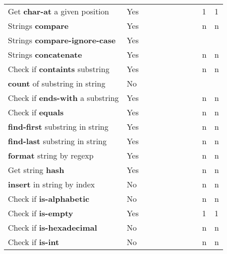 \documentclass[anonymous,sigplan,review,11pt,nonacm,natbib=false]{acmart}
\begin{document}
\begin{longtable}{lllllllllll}
        Get \textbf{char-at} a given position & Yes &  &  &  &  & &  &  & 1 & 1 \\

        Strings \textbf{compare} & Yes &  &  &  &  & &  &  & n & n \\

        Strings \textbf{compare-ignore-case} & Yes &  &  &  &  & &  &  &  & \\

        Strings \textbf{concatenate} & Yes &  &  &  &  & &  &  & n & n \\

        Check if \textbf{containts} substring & Yes &  &  &  &  & &  &  & n & n \\

        \textbf{count} of substring in string & No &  &  &  &  & &  &  &  & \\

        Check if \textbf{ends-with} a substring & Yes &  &  &  &  & &  &  & n & n \\

        Check if \textbf{equals} & Yes &  &  &  &  & &  &  & n & n \\

        \textbf{find-first} substring in string & Yes &  &  &  &  & &  &  & n & n \\

        \textbf{find-last} substring in string & Yes &  &  &  &  & &  &  & n & n \\

        \textbf{format} string by regexp & Yes &  &  &  &  & &  &  & n & n \\

        Get string \textbf{hash} & Yes &  &  &  &  & &  &  & n & n \\

        \textbf{insert} in string by index & No &  &  &  &  & &  &  & n & n \\

        Check if \textbf{is-alphabetic} & No &  &  &  &  & &  &  & n & n \\

        Check if \textbf{is-empty} & Yes &  &  &  &  & &  &  & 1 & 1 \\

        Check if \textbf{is-hexadecimal} & No &  &  &  &  & &  &  & n & n \\

        Check if \textbf{is-int} & No &  &  &  &  & &  &  & n & n \\


\end{longtable}
\end{document}
